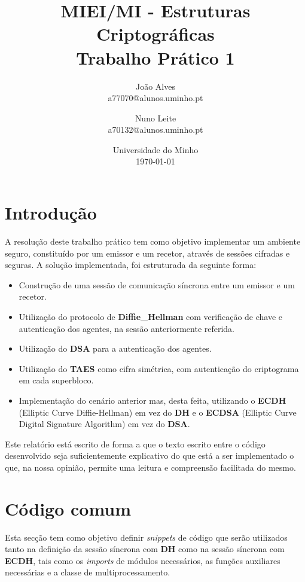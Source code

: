 \documentclass[11pt]{article}
\title{MIEI/MI - Estruturas Criptográficas\\
            \large Trabalho Prático 1}
\author{
        João Alves \\
        a77070@alunos.uminho.pt
        \and
        Nuno Leite \\
        a70132@alunos.uminho.pt
    }
\date{
        Universidade do Minho\\
        \today
    }
\providecommand{\tightlist}{%
      \setlength{\itemsep}{0pt}\setlength{\parskip}{0pt}}
\begin{document}
    
    
    \maketitle
    

    \hypertarget{introduuxe7uxe3o}{%
\section{Introdução}\label{introduuxe7uxe3o}}

    A resolução deste trabalho prático tem como objetivo implementar um
ambiente seguro, constituído por um emissor e um recetor, através de
sessões cifradas e seguras. A solução implementada, foi estruturada da
seguinte forma:

\begin{itemize}
\tightlist
\item
  Construção de uma sessão de comunicação síncrona entre um emissor e um
  recetor.
\item
  Utilização do protocolo de \textbf{Diffie\_Hellman} com verificação de
  chave e autenticação dos agentes, na sessão anteriormente referida.
\item
  Utilização do \textbf{DSA} para a autenticação dos agentes.
\item
  Utilização do \textbf{TAES} como cifra simétrica, com autenticação do
  criptograma em cada superbloco.
\item
  Implementação do cenário anterior mas, desta feita,
  utilizando o \textbf{ECDH} (Elliptic Curve Diffie-Hellman) em vez do
  \textbf{DH} e o \textbf{ECDSA} (Elliptic Curve Digital Signature
  Algorithm) em vez do \textbf{DSA}.
\end{itemize}

Este relatório está escrito de forma a que o texto escrito entre o
código desenvolvido seja suficientemente explicativo do que está a ser
implementado o que, na nossa opinião, permite uma leitura e compreensão
facilitada do mesmo.

    \hypertarget{cuxf3digo-comum}{%
\section{Código comum}\label{cuxf3digo-comum}}

    Esta secção tem como objetivo definir \emph{snippets} de código que
serão utilizados tanto na definição da sessão síncrona com \textbf{DH}
como na sessão síncrona com \textbf{ECDH}, tais como os \emph{imports}
de módulos necessários, as funções auxiliares necessárias e a classe de
multiprocessamento.
\end{document}
